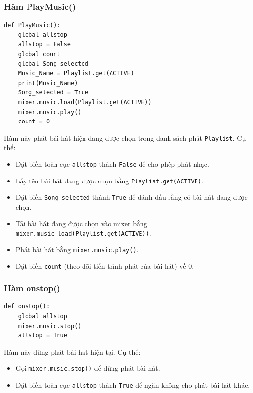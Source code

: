 \documentclass[a4paper]{article}
\begin{document}
\begin{enumerate}
\subsubsection{Hàm PlayMusic()}
\begin{mdframed}[hidealllines=true,backgroundcolor=magenta!10]
\begin{lstlisting}
def PlayMusic():
    global allstop
    allstop = False
    global count
    global Song_selected
    Music_Name = Playlist.get(ACTIVE)
    print(Music_Name)
    Song_selected = True
    mixer.music.load(Playlist.get(ACTIVE))
    mixer.music.play()
    count = 0
\end{lstlisting}
\end{mdframed}
Hàm này phát bài hát hiện đang được chọn trong danh sách phát \texttt{Playlist}. Cụ thể:
\begin{itemize}
    \item Đặt biến toàn cục \texttt{allstop} thành \texttt{False} để cho phép phát nhạc.
    \item Lấy tên bài hát đang được chọn bằng \texttt{Playlist.get(ACTIVE)}.
    \item Đặt biến \texttt{Song\_selected} thành \texttt{True} để đánh dấu rằng có bài hát đang được chọn.
    \item Tải bài hát đang được chọn vào mixer bằng \texttt{mixer.music.load(Playlist.get(ACTIVE))}.
    \item Phát bài hát bằng \texttt{mixer.music.play()}.
    \item Đặt biến \texttt{count} (theo dõi tiến trình phát của bài hát) về 0.
\end{itemize}

\subsubsection{Hàm onstop()}
\begin{mdframed}[hidealllines=true,backgroundcolor=magenta!10]
\begin{lstlisting}
def onstop():
    global allstop
    mixer.music.stop()
    allstop = True
\end{lstlisting}
\end{mdframed}
Hàm này dừng phát bài hát hiện tại. Cụ thể:
\begin{itemize}
    \item Gọi \texttt{mixer.music.stop()} để dừng phát bài hát.
    \item Đặt biến toàn cục \texttt{allstop} thành \texttt{True} để ngăn không cho phát bài hát khác.
\end{itemize}


\end{enumerate}
\end{document}
